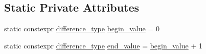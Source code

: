 \subsection*{Static Private Attributes}
\begin{DoxyCompactItemize}
\item 
static constexpr \hyperlink{classnlohmann_1_1basic__json_afe7c1303357e19cea9527af4e9a31d8f}{difference\+\_\+type} \hyperlink{classnlohmann_1_1basic__json_1_1primitive__iterator__t_ac6aac2e2de4c7e5a10694ff173ac5f31}{begin\+\_\+value} = 0
\item 
static constexpr \hyperlink{classnlohmann_1_1basic__json_afe7c1303357e19cea9527af4e9a31d8f}{difference\+\_\+type} \hyperlink{classnlohmann_1_1basic__json_1_1primitive__iterator__t_af911926f73b6c1f697e68eda3b3e2047}{end\+\_\+value} = \hyperlink{classnlohmann_1_1basic__json_1_1primitive__iterator__t_ac6aac2e2de4c7e5a10694ff173ac5f31}{begin\+\_\+value} + 1
\end{DoxyCompactItemize}
